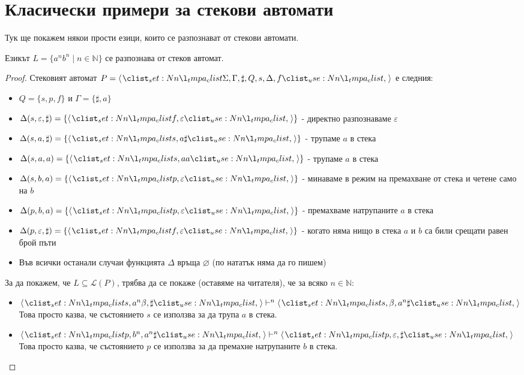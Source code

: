 \section{Класически примери за стекови автомати}

Тук ще покажем някои прости езици, които се разпознават от стекови автомати.

\begin{claim}
    Езикът $L = \{ a^nb^n \mid n \in \mathbb{N} \}$ се разпознава от стеков автомат.
\end{claim}

\begin{proof}
    Стековият автомат $P = \opair{\Sigma, \Gamma, \sharp, Q, s, \Delta, f}$ е следния:

    \begin{itemize}
        \item $Q = \{ s, p, f \}$ и $\Gamma = \{ \sharp, a \}$
        \item $\Delta(s, \varepsilon, \sharp) = \{ \opair{f, \varepsilon} \}$ - директно разпознаваме $\varepsilon$
        \item $\Delta(s, a, \sharp) = \{ \opair{s, a \sharp} \}$ - трупаме $a$ в стека
        \item $\Delta(s, a, a) = \{ \opair{s, aa} \}$ - трупаме $a$ в стека
        \item $\Delta(s, b, a) = \{ \opair{p, \varepsilon} \}$ - минаваме в режим на премахване от стека и четене само на $b$
        \item $\Delta(p, b, a) = \{ \opair{p, \varepsilon} \}$ - премахваме натрупаните $a$ в стека
        \item $\Delta(p, \varepsilon, \sharp) = \{ \opair{f, \varepsilon} \}$ - когато няма нищо в стека $a$ и $b$ са били срещати равен брой пъти
        \item Във всички останали случаи функцията $\Delta$ връща $\varnothing$ (по нататък няма да го пишем)
    \end{itemize}

    За да покажем, че $L \subseteq \mathcal{L}(P)$, трябва да се покаже (оставяме на читателя), че за всяко $n \in \mathbb{N}$:

    \begin{itemize}
        \item $\opair{s, a^n \beta, \sharp} \vdash^n \opair{s, \beta, a^n \sharp}$ \\
              Това просто казва, че състоянието $s$ се използва за да трупа $a$ в стека.
        \item $\opair{p, b^n, a^n \sharp} \vdash^n \opair{p, \varepsilon, \sharp}$ \\
              Това просто казва, че състоянието $p$ се използва за да премахне натрупаните $b$ в стека.
    \end{itemize}


\end{proof}
